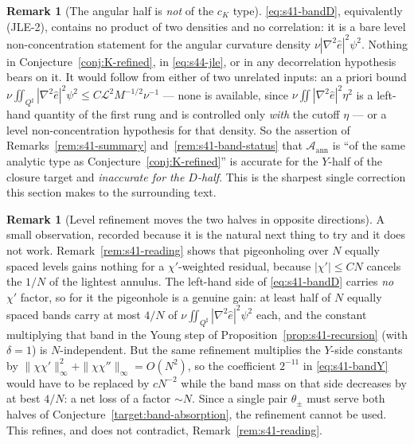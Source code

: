 \documentclass[11pt]{article}
\theoremstyle{definition}
\newtheorem{remark}[theorem]{Remark}
\theoremstyle{remark}
\begin{document}
\begin{remark}[The angular half is \emph{not} of the $c_K$ type]
  \label{rem:s44-bandD}
  \eqref{eq:s41-bandD}, equivalently (JLE-2), contains no product of two
  densities and no correlation: it is a bare level non-concentration statement
  for the angular curvature density $\nu|\nabla^2\hat{e}|^2\psi^2$. Nothing in
  Conjecture~\ref{conj:K-refined}, in \eqref{eq:s44-jle}, or in any
  decorrelation hypothesis bears on it. It would follow from either of two
  unrelated inputs: an a priori bound
  $\nu\iint_{Q^\sharp}|\nabla^2\hat{e}|^2\psi^2
  \leq C\mathcal{L}^2M^{-1/2}\nu^{-1}$ --- none is available, since
  $\nu\iint|\nabla^2\hat{e}|^2\eta^2$ is a left-hand quantity of the first
  rung and is controlled only \emph{with} the cutoff $\eta$ --- or a level
  non-concentration hypothesis for that density. So the assertion of
  Remarks~\ref{rem:s41-summary} and~\ref{rem:s41-band-status} that
  $\mathcal{A}_{\mathrm{ann}}$ is ``of the same analytic type as
  Conjecture~\ref{conj:K-refined}'' is accurate for the $Y$-half of the
  closure target and \emph{inaccurate for the $D$-half}. This is the sharpest
  single correction this section makes to the surrounding text.
\end{remark}

\begin{remark}[Level refinement moves the two halves in opposite directions]
  \label{rem:s44-refinement}
  A small observation, recorded because it is the natural next thing to try
  and it does not work. Remark~\ref{rem:s41-reading} shows that pigeonholing
  over $N$ equally spaced levels gains nothing for a $\chi'$-weighted
  residual, because $|\chi'|\leq CN$ cancels the $1/N$ of the lightest
  annulus. The left-hand side of \eqref{eq:s41-bandD} carries \emph{no}
  $\chi'$ factor, so for it the pigeonhole is a genuine gain: at least half of
  $N$ equally spaced bands carry at most $4/N$ of
  $\nu\iint_{Q^\sharp}|\nabla^2\hat{e}|^2\psi^2$ each, and the constant
  multiplying that band in the Young step of
  Proposition~\ref{prop:s41-recursion} (with $\delta=1$) is $N$-independent.
  But the same refinement multiplies the $Y$-side constants by
  $\|\chi\chi'\|_\infty^2+\|\chi\chi''\|_\infty=O(N^2)$, so the coefficient
  $2^{-11}$ in \eqref{eq:s41-bandY} would have to be replaced by $cN^{-2}$
  while the band mass on that side decreases by at best $4/N$: a net loss of a
  factor $\sim N$. Since a single pair $\theta_\pm$ must serve both halves of
  Conjecture~\ref{target:band-absorption}, the refinement cannot be used.
  This refines, and does not contradict, Remark~\ref{rem:s41-reading}.
\end{remark}
\end{document}
